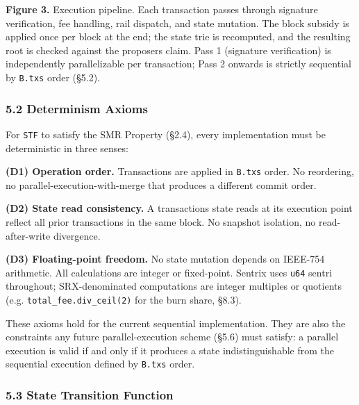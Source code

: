 \documentclass[11pt,a4paper]{article}
\begin{document}
\textbf{Figure 3.} Execution pipeline. Each transaction passes through
signature verification, fee handling, rail dispatch, and state mutation.
The block subsidy is applied once per block at the end; the state trie
is recomputed, and the resulting root is checked against the
proposer\textquotesingle s claim. Pass 1 (signature verification) is
independently parallelizable per transaction; Pass 2 onwards is strictly
sequential by \texttt{B.txs} order (§5.2).

\hypertarget{52-determinism-axioms}{%
\subsubsection{5.2 Determinism Axioms}\label{52-determinism-axioms}}

For \texttt{STF} to satisfy the SMR Property (§2.4), every
implementation must be deterministic in three senses:

\textbf{(D1) Operation order.} Transactions are applied in
\texttt{B.txs} order. No reordering, no parallel-execution-with-merge
that produces a different commit order.

\textbf{(D2) State read consistency.} A transaction\textquotesingle s
state reads at its execution point reflect all prior transactions in the
same block. No snapshot isolation, no read-after-write divergence.

\textbf{(D3) Floating-point freedom.} No state mutation depends on
IEEE-754 arithmetic. All calculations are integer or fixed-point.
Sentrix uses \texttt{u64} sentri throughout; SRX-denominated
computations are integer multiples or quotients (e.g.
\texttt{total\_fee.div\_ceil(2)} for the burn share, §8.3).

These axioms hold for the current sequential implementation. They are
also the constraints any future parallel-execution scheme (§5.6) must
satisfy: a parallel execution is valid if and only if it produces a
state indistinguishable from the sequential execution defined by
\texttt{B.txs} order.

\hypertarget{53-state-transition-function}{%
\subsubsection{5.3 State Transition
Function}\label{53-state-transition-function}}
\end{document}

